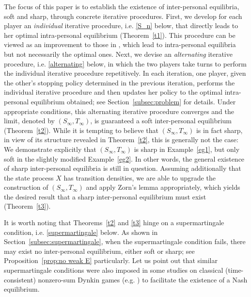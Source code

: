 \documentclass[11pt,reqno]{article}
\numberwithin{equation}{section}
\begin{document}
The focus of this paper is to establish the existence of inter-personal equilibria, soft and sharp, through concrete iterative procedures. First, we develop for each player an {\it individual} {iterative procedure}, i.e. \eqref{S_n} below, that directly leads to her optimal intra-personal equilibrium (Theorem~\ref{t1}). This procedure can be viewed as an improvement to those in \cite{HN18, HNZ20}, which lead to intra-personal equilibria but not necessarily the optimal ones. Next, we devise an {\it alternating} iterative procedure, i.e. \eqref{alternating} below, in which the two players {take turns} to perform the individual iterative procedure repetitively. In each iteration, one player, given the other's stopping policy determined in the previous iteration, performs the individual iterative procedure and then updates her policy to the optimal intra-personal equilibrium obtained; see Section~\ref{subsec:problem} for details. Under appropriate conditions, this alternating iterative procedure converges and the limit, denoted by $(S_\infty, T_\infty)$, is guaranteed a soft inter-personal equilibrium (Theorem~\ref{t2}). While it is tempting to believe that $(S_\infty, T_\infty)$ is in fact sharp, in view of its structure revealed in Theorem~\ref{t2}, this is generally not the case: We demonstrate explicitly that $(S_\infty, T_\infty)$ is sharp in Example~\ref{eg1}, but only soft in the slightly modified Example~\ref{eg2}. In other words, the general existence of sharp inter-personal equilibria is still in question. Assuming additionally that the state process $X$ has transition densities, we are able to upgrade the construction of $(S_\infty, T_\infty)$ and apply Zorn's lemma appropriately, which yields the desired result that a sharp inter-personal equilibrium must exist (Theorem~\ref{t3}). 

It is worth noting that Theorems~\ref{t2} and \ref{t3} hinge on a supermartingale condition, i.e. \eqref{supermartingale} below. As shown in Section~\ref{subsec:supermartingale}, when the supermartingale condition fails, there may exist no inter-personal equilibrium, either soft or sharp; see Proposition~\ref{prop:no weak E} particularly. Let us point out that similar supermartingale conditions were also imposed in some studies on classical (time-consistent) nonzero-sum Dynkin games (e.g. \cite{Morimoto86, Ohtsubo87}) to facilitate the existence of a Nash equilibrium.
\end{document}
